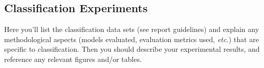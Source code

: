 \subsection{Classification Experiments}

Here you'll list the classification data sets (see report guidelines) and explain any methodological
aspects (models evaluated, evaluation metrics used, {\em etc.}) that are specific to classification.
Then you should describe your experimental results,
and reference any relevant figures and/or tables.

